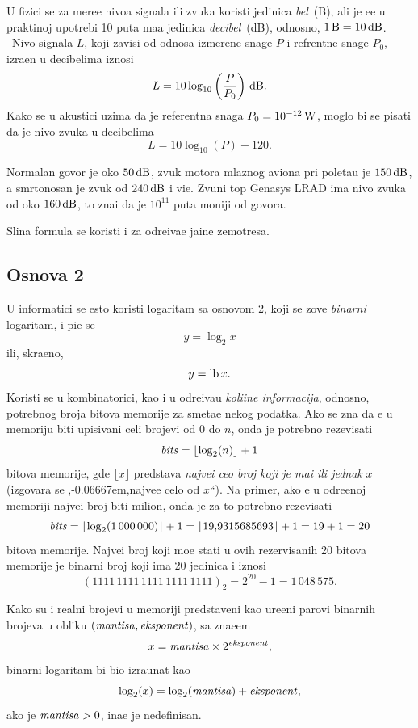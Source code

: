 \documentclass[12pt, twoside, a4paper]{article}
\def\navod#1{\relax,\kern-0.06667em,\relax#1\relax``\relax}
\def\logten{\log_{10}}
\def\logtwo{\log_2}
\def\puta{\times}
\def\.{{,}}
\def\um#1{\,{\rm#1}}
\begin{document}
U fizici se za mere{\nj}e nivoa signala ili zvuka koristi jedinica {\sl be\/l}~(B), ali je {\cv}e{\sv}{\cc}e
u prakti{\cv}noj upotrebi 10 puta ma{\nj}a jedinica {\sl decibel\/}~(dB), odnosno, $1\um{B}=10\um{dB}$. \
Nivo \hbox{sig\-na\-la} $L$, koji zavisi
od odnosa izmerene snage $P$ i refrentne snage $P_0$, izra{\zv}en u deci\-belima iznosi
$$
L=10\logten\left({P\over P_0}\right)\um{dB}.
$$
Kako se u akustici uzima da je referentna snaga $P_0=10^{-12}\um W$, moglo bi se pisati
da je nivo zvuka u decibelima
$$
L=10\logten(P)-120.
$$

Normalan govor je oko $50\um{dB}$, 
zvuk motora mlaznog aviona pri poleta{\nj}u je $150\um{dB}$, 
a smrtonosan je zvuk od $240\um{dB}$ i vi{\sv}e.
Zvu{\cv}ni top {\sf Genasys LRAD} ima nivo zvuka od oko $160\um{dB}$,
{\sv}to zna{\cv}i da je $10^{11}$ puta mo{\cc}niji od govora.

Sli{\cv}na formula se koristi i za odre{\dj}iva{\nj}e ja{\cv}ine zem{\lj}otresa.

\subsection{Osnova 2}

\def\lb{\mathop{\rm lb}}
\def\bits{{\it bits}}
\def\mant{{\it mantisa}}%
\def\expo{{\it eksponent}}%
\def\znak{{\it znak}}%

U informatici se {\cv}esto koristi logaritam sa osnovom 2, koji se zove {\sl binarni\/} logaritam,
i pi{\sv}e se
$$
y=\logtwo x
$$
ili, skra{\cc}eno,
$$
y=\lb x.
$$
Koristi se u kombinatorici, kao i u odre{\dj}iva{\nj}u {\sl koli{\cv}ine informacija},
odnosno, potrebnog broja bitova me\-mo\-ri\-je za sme{\sv}ta{\nj}e nekog podatka.
Ako se zna da {\cc}e u me\-mo\-ri\-ju biti upisivani celi brojevi od 0 do $n$, onda je potrebno rezevisati
$$
\bits = \lfloor\logtwo(n)\rfloor+1
$$
bitova memorije, gde $\lfloor x\rfloor$ predstav{\lj}a {\sl najve{\cc}i ceo broj koji je ma{\nj}i ili jednak} $x$
(izgovara se \navod{najve{\cc}e celo od $x$}). 
Na primer, ako {\cc}e u odre{\dj}enoj memoriji najve{\cc}i 
broj biti milion, onda je za to potrebno rezevisati
$$
\bits=\lfloor\logtwo(1\,000\,000)\rfloor+1=\lfloor 19\.9315685693\rfloor+1 = 19+1=20
$$
bitova memorije. Najve{\cc}i broj koji mo{\zv}e stati u ovih rezervisanih 20 bitova memorije je binarni broj koji ima 20 jedinica
i iznosi 
$$
(1111\,1111\,1111\,1111\,1111)_2=
2^{20}-1=1\,048\,575.
$$

Kako su i realni brojevi u memoriji predstav{\lj}eni kao ure{\dj}eni parovi binarnih brojeva u obliku
$(\mant,\expo)$, sa zna{\cv}e{\nj}em
$$
x=\mant\puta2^\expo,
$$
binarni logaritam bi bio izra{\cv}unat kao
$$
\logtwo(x)=\logtwo(\mant)+\expo,
$$
ako je $\mant>0$, ina{\cv}e je nedefinisan.
\end{document}
